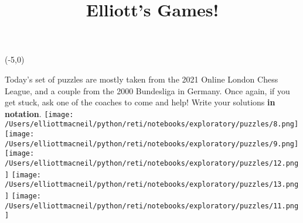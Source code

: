 \documentclass{article}
\date{}
\title{Elliott's Games!}
\begin{document}
    \maketitle
    \centering
    \begin{textblock}{50}(-5,0)
    \end{textblock}
    Today's set of puzzles are mostly taken from the 2021 Online London Chess League, and a couple from the 2000 Bundesliga in Germany.
    Once again, if you get stuck, ask one of the coaches to come and help! Write your solutions \textbf{in notation}. 
    \newline
    \texttt{[image: /Users/elliottmacneil/python/reti/notebooks/exploratory/puzzles/8.png]}
\texttt{[image: /Users/elliottmacneil/python/reti/notebooks/exploratory/puzzles/9.png]}
\texttt{[image: /Users/elliottmacneil/python/reti/notebooks/exploratory/puzzles/12.png]}
\texttt{[image: /Users/elliottmacneil/python/reti/notebooks/exploratory/puzzles/13.png]}
\texttt{[image: /Users/elliottmacneil/python/reti/notebooks/exploratory/puzzles/11.png]}
\end{document}
